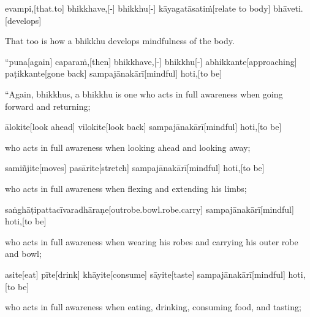 \begin{samepage}
\begingl[glneveryline={\PaliGlossA,\PaliGlossB}]
evampi,[that.to] bhikkhave,[-] bhikkhu[-] kāyagatāsatiṁ[relate to body] bhāveti.[develops]
\endgl
\nopagebreak
\linespread{0.5}
\begin{spacin}{0.2}
{\PaliGlossFT That too is how a bhikkhu develops mindfulness of the body.}
\end{spacin}
\vskip 12pt
\end{samepage}
\vskip 0.2in
\begin{samepage}
\begingl[glneveryline={\PaliGlossA,\PaliGlossB}]
“puna[again] caparaṁ,[then] bhikkhave,[-] bhikkhu[-] abhikkante[approaching] paṭikkante[gone back] sampajānakārī[mindful] hoti,[to be]
\endgl
\nopagebreak
\linespread{0.5}
\begin{spacin}{0.2}
{\PaliGlossFT “Again, bhikkhus, a bhikkhu is one who acts in full awareness when going forward and returning;}
\end{spacin}
\vskip 12pt
\end{samepage}
\begin{samepage}
\begingl[glneveryline={\PaliGlossA,\PaliGlossB}]
ālokite[look ahead] vilokite[look back] sampajānakārī[mindful] hoti,[to be]
\endgl
\nopagebreak
\linespread{0.5}
\begin{spacin}{0.2}
{\PaliGlossFT who acts in full awareness when looking ahead and looking away;}
\end{spacin}
\vskip 12pt
\end{samepage}
\begin{samepage}
\begingl[glneveryline={\PaliGlossA,\PaliGlossB}]
samiñjite[moves] pasārite[stretch] sampajānakārī[mindful] hoti,[to be]
\endgl
\nopagebreak
\linespread{0.5}
\begin{spacin}{0.2}
{\PaliGlossFT who acts in full awareness when flexing and extending his limbs;}
\end{spacin}
\vskip 12pt
\end{samepage}
\begin{samepage}
\begingl[glneveryline={\PaliGlossA,\PaliGlossB}]
saṅghāṭipattacīvaradhāraṇe[outrobe.bowl.robe.carry] sampajānakārī[mindful] hoti,[to be]
\endgl
\nopagebreak
\linespread{0.5}
\begin{spacin}{0.2}
{\PaliGlossFT who acts in full awareness when wearing his robes and carrying his outer robe and bowl;}
\end{spacin}
\vskip 12pt
\end{samepage}
\begin{samepage}
\begingl[glneveryline={\PaliGlossA,\PaliGlossB}]
asite[eat] pīte[drink] khāyite[consume] sāyite[taste] sampajānakārī[mindful] hoti,[to be]
\endgl
\nopagebreak
\linespread{0.5}
\begin{spacin}{0.2}
{\PaliGlossFT who acts in full awareness when eating, drinking, consuming food, and tasting;}
\end{spacin}
\vskip 12pt
\end{samepage}
